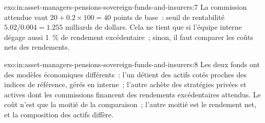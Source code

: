 \begin{solution}{exo:in:asset-managers-pensions-sovereign-funds-and-insurers:7}
La commission attendue vaut $20+0.2\times100=40$ points de base~: seuil de rentabilité $5.02/0.004=1.255$ milliards de dollars. Cela ne tient que si
l'équipe interne dégage aussi 1~\% de rendement excédentaire~; sinon, il faut comparer les coûts nets des rendements.
\end{solution}

\begin{solution}{exo:in:asset-managers-pensions-sovereign-funds-and-insurers:8}
Les deux fonds ont des modèles économiques différents~: l'un détient des actifs cotés proches des indices de référence, gérés en interne~; l'autre
achète des stratégies privées et actives dont les commissions financent des rendements excédentaires attendus. Le coût n'est que la
moitié de la comparaison~; l'autre moitié est le rendement net, et la composition des actifs diffère.
\end{solution}

